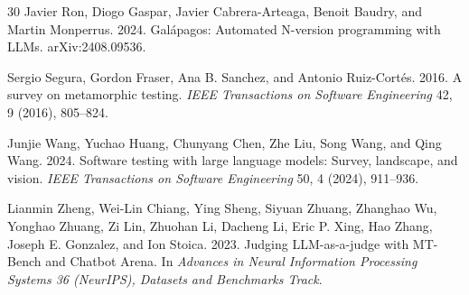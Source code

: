 \documentclass[sigconf,nonacm]{acmart}
\begin{document}
\begin{thebibliography}{30}
Javier Ron, Diogo Gaspar, Javier Cabrera-Arteaga, Benoit Baudry, and Martin Monperrus. 2024.
Galápagos: Automated N-version programming with LLMs.
arXiv:2408.09536.

Sergio Segura, Gordon Fraser, Ana B. Sanchez, and Antonio Ruiz-Cortés. 2016.
A survey on metamorphic testing.
\textit{IEEE Transactions on Software Engineering} 42, 9 (2016), 805--824.

Junjie Wang, Yuchao Huang, Chunyang Chen, Zhe Liu, Song Wang, and Qing Wang. 2024.
Software testing with large language models: Survey, landscape, and vision.
\textit{IEEE Transactions on Software Engineering} 50, 4 (2024), 911--936.

Lianmin Zheng, Wei-Lin Chiang, Ying Sheng, Siyuan Zhuang, Zhanghao Wu, Yonghao Zhuang, Zi Lin, Zhuohan Li, Dacheng Li, Eric P. Xing, Hao Zhang, Joseph E. Gonzalez, and Ion Stoica. 2023.
Judging LLM-as-a-judge with MT-Bench and Chatbot Arena.
In \textit{Advances in Neural Information Processing Systems 36 (NeurIPS), Datasets and Benchmarks Track}.

\end{thebibliography}
\end{document}
